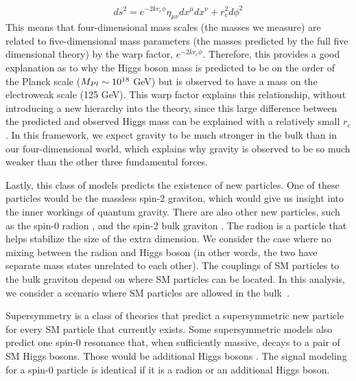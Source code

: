 \begin{equation}
ds^{2} = e^{-2kr_{c}\phi}\eta_{\mu\nu}dx^{\mu}dx^{\nu} + r^{2}_{c}d\phi^{2} 
\end{equation}
This means that four-dimensional mass scales (the masses we measure) are related to five-dimensional mass parameters (the masses predicted by the full five dimensional theory) by the warp factor, $e^{-2kr_{c}\phi}$. Therefore, this provides a good explanation as to why the Higgs boson mass is predicted to be on the order of the Planck scale ($M_{Pl} \sim 10^{18}$ GeV) but is observed to have a mass on the electroweak scale (125 GeV). This warp factor explains this relationship, without introducing a new hierarchy into the theory, since this large difference between the predicted and observed Higgs mass can be explained with a relatively small $r_{c}$. In this framework, we expect gravity to be much stronger in the bulk than in our four-dimensional world, which explains why gravity is observed to be so much weaker than the other three fundamental forces.

Lastly, this class of models predicts the existence of new particles. One of these particles would be the massless spin-2 graviton, which would give us insight into the inner workings of quantum gravity. There are also other new particles, such as the spin-0 radion \cite{Goldberger:1999uk,DeWolfe:1999cp,Csaki:1999mp}, and the spin-2 bulk graviton \cite{Davoudiasl:1999jd,Csaki:2000zn, Agashe:2007zd}. The radion is a particle that helps stabilize the size of the extra dimension. We consider the case where no mixing between the radion and Higgs boson (in other words, the two have separate mass states unrelated to each other). The couplings of SM particles to the bulk graviton depend on where SM particles can be located. In this analysis, we consider a scenario where SM particles are allowed in the bulk~\cite{Fitzpatrick:2007qr}.

Supersymmetry is a class of theories that predict a supersymmetric new particle for every SM particle that currently exists. Some supersymmetric models also predict one spin-0 resonance that, when sufficiently massive, decays to a pair of SM Higgs bosons. Those would be additional Higgs bosons \cite{Djouadi:2005gj,Barbieri:2013nka}. The signal modeling for a spin-0 particle is identical if it is a radion or an additional Higgs boson.

